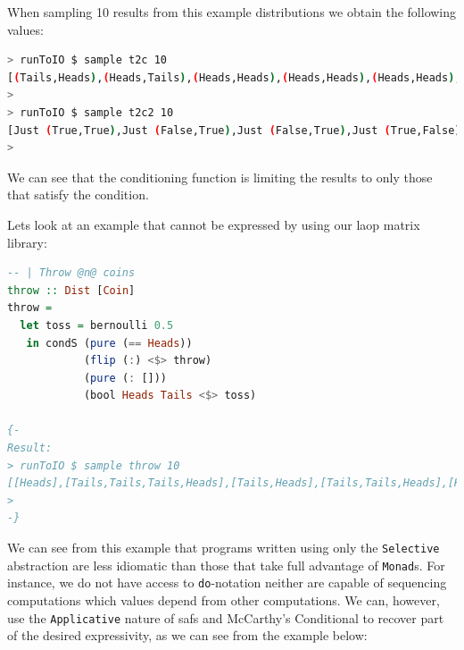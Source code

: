\documentclass[
  oneside,
  11pt, a4paper,
  footinclude=true,
  headinclude=true,
  cleardoublepage=empty
]{scrbook}
\theoremstyle{definition}
\theoremstyle{definition}
\begin{document}
    When sampling 10 results from this example distributions we obtain the following values:
    
    \begin{lstlisting}[language=Bash, caption={Coin toss results},captionpos=b]
> runToIO $ sample t2c 10
[(Tails,Heads),(Heads,Tails),(Heads,Heads),(Heads,Heads),(Heads,Heads),(Tails,Heads),(Heads,Tails),(Tails,Heads),(Heads,Heads),(Heads,Heads)] 
>
> runToIO $ sample t2c2 10
[Just (True,True),Just (False,True),Just (False,True),Just (True,False),Nothing,Just (True,False),Nothing,Nothing,Just (False,True),Just (True,True)]
>
    \end{lstlisting}
    
    We can see that the conditioning function is limiting the results to only those that satisfy the condition.

    Lets look at an example that cannot be expressed by using our \gls{laop} matrix library:
    
    \begin{lstlisting}[language=Haskell, caption={Throw coins indefinitely until Heads comes up},captionpos=b]
-- | Throw @n@ coins
throw :: Dist [Coin]
throw =
  let toss = bernoulli 0.5
   in condS (pure (== Heads))
            (flip (:) <$> throw)
            (pure (: []))
            (bool Heads Tails <$> toss)

{-
Result:
> runToIO $ sample throw 10
[[Heads],[Tails,Tails,Tails,Heads],[Tails,Heads],[Tails,Tails,Heads],[Heads],[Heads],[Tails,Heads],[Tails,Heads],[Heads],[Tails,Heads]]
>
-}
    \end{lstlisting}
    
    We can see from this example that programs written using only the \texttt{Selective} abstraction are less idiomatic than those that take full advantage of \texttt{Monad}s. For instance, we do not have access to \texttt{do}-notation neither are capable of sequencing computations which values depend from other computations. We can, however, use the \texttt{Applicative} nature of \glspl{saf} and McCarthy's Conditional to recover part of the desired expressivity, as we can see from the example below:
    
\end{document}
